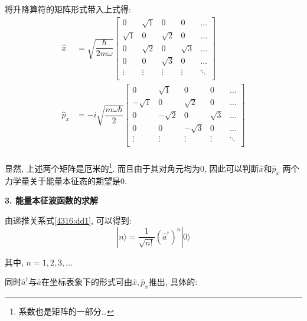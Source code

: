 \documentclass[a4paper, 11pt]{article}
\begin{document}
\begin{spacing}{1.2}
        将升降算符的矩阵形式带入上式得:
        \begin{equation}
          \begin{aligned}
          \hat{x} &= \sqrt{\dfrac{\hbar}{2m\omega}}
          \begin{bmatrix}
            0       & \sqrt{1} & 0        & 0       &\ldots \\
            \sqrt{1}& 0        & \sqrt{2} & 0       &\ldots \\
            0       & \sqrt{2} & 0        & \sqrt{3}&\ldots \\
            0       & 0        & \sqrt{3} & 0       &\ldots \\
            \vdots  & \vdots   & \vdots   & \vdots  &\ddots \\
          \end{bmatrix}\\[4pt]
          \hat{p}_x &= -i\sqrt{\dfrac{m\omega\hbar}{2}}
          \begin{bmatrix}
            0        & \sqrt{1} & 0        & 0       &\ldots \\
            -\sqrt{1}& 0        & \sqrt{2} & 0       &\ldots \\
            0        & -\sqrt{2}& 0        & \sqrt{3}&\ldots \\
            0        & 0        & -\sqrt{3}& 0       &\ldots \\
            \vdots   & \vdots   & \vdots   & \vdots  &\ddots \\
          \end{bmatrix}\\
          \end{aligned}
        \end{equation}
        
        显然, 上述两个矩阵是厄米的\footnote{系数也是矩阵的一部分\ldots}. 
        而且由于其对角元均为$0$, 因此可以判断$\hat{x}$和$\hat{p}_x$
        两个力学量关于能量本征态的期望是$0$.

        \textbf{3. 能量本征波函数的求解}

        由递推关系式\eqref{4316:dd1}, 可以得到:
        \begin{equation}
          \label{4407:nn}
          |n\rangle = \dfrac{1}{\sqrt{n!}}\left(\hat{a}^{\dagger}\right)^n|0\rangle
        \end{equation}

        其中, $n=1,2,3,\ldots$

        同时$\hat{a}^{\dagger}$与$\hat{a}$在坐标表象下的形式可由$\hat{x}, \hat{p}_x$推出, 具体的:


\end{spacing}
\end{document}
